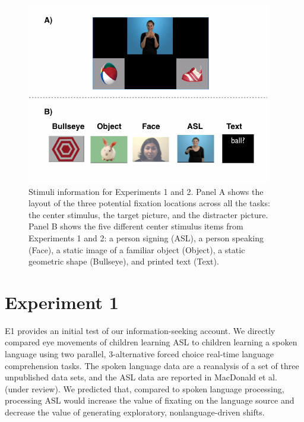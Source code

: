 \documentclass[10pt, letterpaper]{article}
\newenvironment{CodeChunk}{}{}
\begin{document}
\begin{CodeChunk}
\begin{figure}[t]

{\centering \includegraphics{figs/e1_stimuli-1} 

}

\caption[Stimuli information for Experiments 1 and 2]{Stimuli information for Experiments 1 and 2. Panel A shows the layout of the three potential fixation locations across all the tasks: the center stimulus, the target picture, and the distracter picture. Panel B shows the five different center stimulus items from Experiments 1 and 2: a person signing (ASL), a person speaking (Face), a static image of a familiar object (Object), a static geometric shape (Bullseye), and printed text (Text).}\label{fig:e1_stimuli}
\end{figure}
\end{CodeChunk}

\section{Experiment 1}\label{experiment-1}

E1 provides an initial test of our information-seeking account. We
directly compared eye movements of children learning ASL to children
learning a spoken language using two parallel, 3-alternative forced
choice real-time language comprehension tasks. The spoken language data
are a reanalysis of a set of three unpublished data sets, and the ASL
data are reported in MacDonald et al. (under review). We predicted that,
compared to spoken language processing, processing ASL would increase
the value of fixating on the language source and decrease the value of
generating exploratory, nonlanguage-driven shifts.
\end{document}
